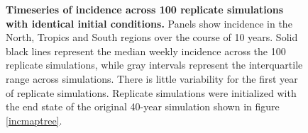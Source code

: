 \pagebreak

\begin{figure}[!c]
	\centering
	\caption{\textbf{Timeseries of incidence across 100 replicate simulations with identical initial conditions.} Panels show incidence in the North, Tropics and South regions over the course of 10 years.  Solid black lines represent the median weekly incidence across the 100 replicate simulations, while gray intervals represent the interquartile range across simulations.  There is little variability for the first year of replicate simulations.  Replicate simulations were initialized with the end state of the original 40-year simulation shown in figure \ref{incmaptree}.}
	\label{replicatetimeseries}
\end{figure}

\pagebreak

